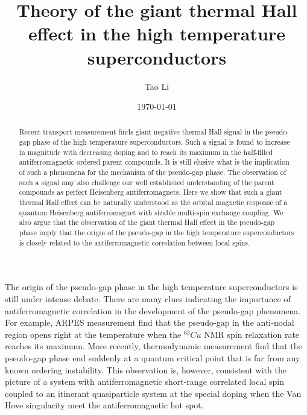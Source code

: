 \documentclass[prb,twocolumn,showpacs]{revtex4}
\begin{document}
\title[Short title for running header]{Theory of the giant thermal Hall effect in the high temperature superconductors}
\author{Tao Li}
\date{\today}

\begin{abstract}
Recent transport measurement finds giant negative thermal Hall signal in the pseudo-gap phase of the high temperature superconductors\cite{Taillefer}. Such a signal is found to increase in magnitude with decreasing doping and to reach its maximum in the half-filled antiferromagnetic ordered parent compounds. It is still elusive what is the implication of such a phenomena for the mechanism of the pseudo-gap phase. The observation of such a signal may also challenge our well established understanding of the parent compounds as perfect Heisenberg antiferromagnets. Here we show that such a giant thermal Hall effect can be naturally understood as the orbital magnetic response of a quantum Heisenberg antiferromagnet with sizable multi-spin exchange coupling. We also argue that the observation of the giant thermal Hall effect in the pseudo-gap phase imply that the origin of the pseudo-gap in the high temperature superconductors is closely related to the antiferromagnetic correlation between local spins.    
\end{abstract}

\maketitle


The origin of the pseudo-gap phase in the high temperature superconductors is still under intense debate. There are many clues indicating the importance of antiferromagnetic correlation in the development of the pseudo-gap phenomena. For example, ARPES measurement find that the pseudo-gap in the anti-nodal region opens right at the temperature when the $^{63}Cu$ NMR spin relaxation rate reaches its maximum\cite{Hashimoto}. More recently, thermodynamic measurement find that the pseudo-gap phase end suddenly at a quantum critical point that is far from any known ordering instability\cite{Michon}. This observation is, however, consistent with the picture of a system with antiferromagnetic short-range correlated local spin coupled to an itinerant quasiparticle system at the special doping when the Van Hove singularity meet the antiferromagnetic hot spot\cite{Li}.    
\end{document}
